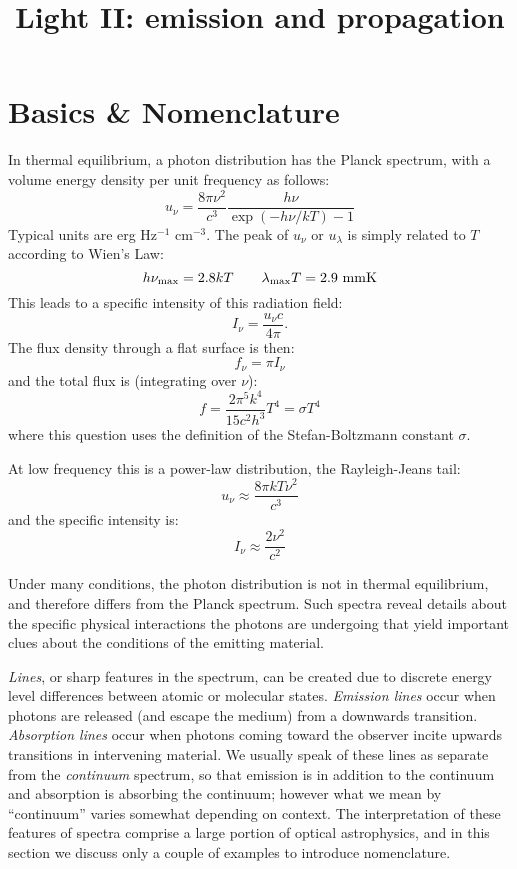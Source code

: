 \title{\bf Light II: emission and propagation}

\section{Basics \& Nomenclature}

In thermal equilibrium, a photon distribution has the Planck spectrum,
with a volume energy density per unit frequency as follows:
\begin{equation}
u_\nu = \frac{8\pi \nu^2}{c^3} \frac{h\nu}{\exp(-h\nu/kT)-1} 
\end{equation}
Typical units are erg Hz$^{-1}$ cm$^{-3}$.
The peak of $u_\nu$ or $u_\lambda$ is simply related to $T$ according
to Wien's Law:
\begin{equation}
\label{eq:wiens}
h\nu_{\rm max} = 2.8 kT \quad\quad
\lambda_{\rm max} T = 2.9 {\rm ~mm} {\rm K} 
\end{equation}
This leads to a specific intensity of this radiation field:
\begin{equation}
I_\nu = \frac{u_\nu c}{4\pi}.
\end{equation}
The flux density through a flat surface is then:
\begin{equation}
f_\nu = \pi I_\nu 
\end{equation}
and the total flux is (integrating over $\nu$):
\begin{equation}
f = \frac{2\pi^5 k^4}{15 c^2 h^3} T^4 = \sigma T^4
\end{equation}
where this question uses the definition of the Stefan-Boltzmann
constant $\sigma$.

At low frequency this is a power-law distribution, the Rayleigh-Jeans
tail:
\begin{equation}
u_\nu \approx \frac{8\pi k T \nu^2 }{c^3}
\end{equation}
and the specific intensity is:
\begin{equation}
I_\nu \approx \frac{2 \nu^2 }{c^2}
\end{equation}

Under many conditions, the photon distribution is not in thermal
equilibrium, and therefore differs from the Planck spectrum. Such
spectra reveal details about the specific physical interactions the
photons are undergoing that yield important clues about the conditions
of the emitting material.

{\it Lines}, or sharp features in the spectrum, can be created due to
discrete energy level differences between atomic or molecular
states. {\it Emission lines} occur when photons are released (and
escape the medium) from a downwards transition. {\it Absorption lines}
occur when photons coming toward the observer incite upwards
transitions in intervening material. We usually speak of these lines
as separate from the {\it continuum} spectrum, so that emission is in
addition to the continuum and absorption is absorbing the continuum;
however what we mean by ``continuum'' varies somewhat depending on
context.  The interpretation of these features of spectra comprise a
large portion of optical astrophysics, and in this section we discuss
only a couple of examples to introduce nomenclature.

